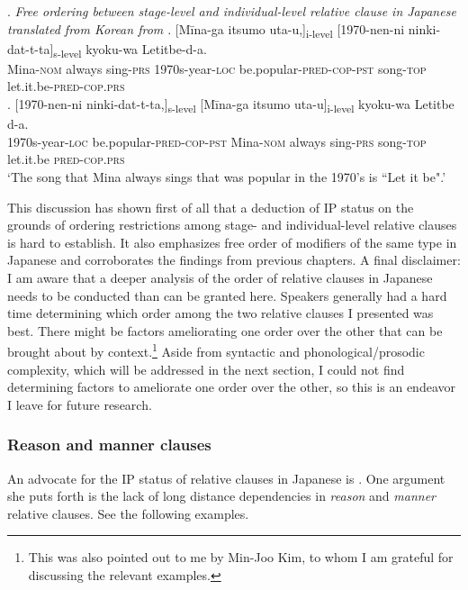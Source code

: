 \ex. \label{free order s- and l- in Japanese} \emph{Free ordering between stage-level and individual-level relative clause in Japanese translated from Korean from \citet[85]{kim:2019:syntax}}
\ag. [Mīna-ga itsumo uta-u,]\textsubscript{i-level} [1970-nen-ni ninki-dat-t-ta]\textsubscript{s-level} kyoku-wa Letitbe-d-a.\\
Mina-\textsc{nom} always sing-\textsc{prs} 1970s-year-\textsc{loc} be.popular-\textsc{pred-cop-pst} song-\textsc{top} let.it.be-\textsc{pred-cop.prs}\\
\bg. [1970-nen-ni ninki-dat-t-ta,]\textsubscript{s-level} [Mīna-ga itsumo uta-u]\textsubscript{i-level} kyoku-wa Letitbe d-a.\\
1970s-year-\textsc{loc} be.popular-\textsc{pred-cop-pst} Mina-\textsc{nom} always sing-\textsc{prs} song-\textsc{top} let.it.be \textsc{pred-cop.prs}\\
`The song that Mina always sings that was popular in the 1970's is ``Let it be".’

This discussion has shown first of all that a deduction of IP status on the grounds of ordering restrictions among stage- and individual-level relative clauses is hard to establish. It also emphasizes free order of modifiers of the same type in Japanese and corroborates the findings from previous chapters. A final disclaimer: I am aware that a deeper analysis of the order of relative clauses in Japanese needs to be conducted than can be granted here. Speakers generally had a hard time determining which order among the two relative clauses I presented was best. There might be factors ameliorating one order over the other that can be brought about by context.\footnote{This was also pointed out to me by Min-Joo Kim, to whom I am grateful for discussing the relevant examples.} Aside from syntactic and phonological/prosodic complexity, which will be addressed in the next section, I could not find determining factors to ameliorate one order over the other, so this is an endeavor I leave for future research.

\subsubsection{Reason and manner clauses} \label{reason and manner}

An advocate for the IP status of relative clauses in Japanese is \citet{murasugi:1991:noun}. One argument she puts forth is the lack of long distance dependencies in \textit{reason} and \textit{manner} relative clauses. See the following examples. 

